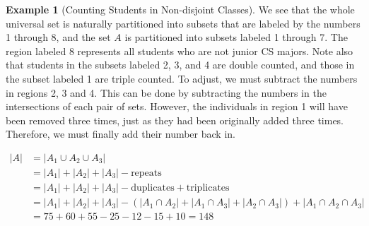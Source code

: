 \documentclass[10pt,]{book}
\theoremstyle{plain}
\theoremstyle{definition}
\theoremstyle{definition}
\newtheorem{example}[theorem]{Example}
\theoremstyle{definition}
\begin{document}
\begin{example}[Counting Students in Non-disjoint Classes]
 We see that the whole universal set is naturally partitioned into subsets that are labeled by the numbers 1 through 8, and the set \(A\)  is  partitioned into subsets labeled 1 through 7. The region labeled 8 represents all students who are not junior CS majors.  Note also that students in the subsets labeled 2, 3, and 4 are double counted, and those in the subset labeled 1 are triple counted. To adjust, we must subtract the numbers in regions 2, 3 and 4.  This can be done by subtracting the numbers in the intersections of each pair of sets.  However, the individuals in region 1 will have been removed three times, just as they had been originally added three times.  Therefore, we must finally add their number back in.
%
\par
\begin{equation*}
\begin{split}
 \lvert A \rvert & =  \lvert A_1 \cup A_2 \cup A_3 \rvert \\ 
 & = \lvert A_1 \rvert + \lvert A_2 \rvert + \lvert A_3 \rvert - \textrm{repeats} \\
 & = \lvert A_1 \rvert + \lvert A_2 \rvert + \lvert A_3 \rvert - \textrm{duplicates} + \textrm{triplicates}  \\
 & = \lvert A_1 \rvert + \lvert A_2 \rvert + \lvert A_3 \rvert - \left(\lvert A_1 \cap A_2 \rvert + \lvert A_1 \cap A_3 \rvert+ \lvert A_2 \cap A_3 \rvert \right) + \lvert A_1 \cap A_2 \cap A_3 \rvert  \\
 & = 75 + 60 + 55 - 25 - 12 - 15 + 10 = 148 
\end{split}
\end{equation*}
%
\end{example}
\par
\end{document}
